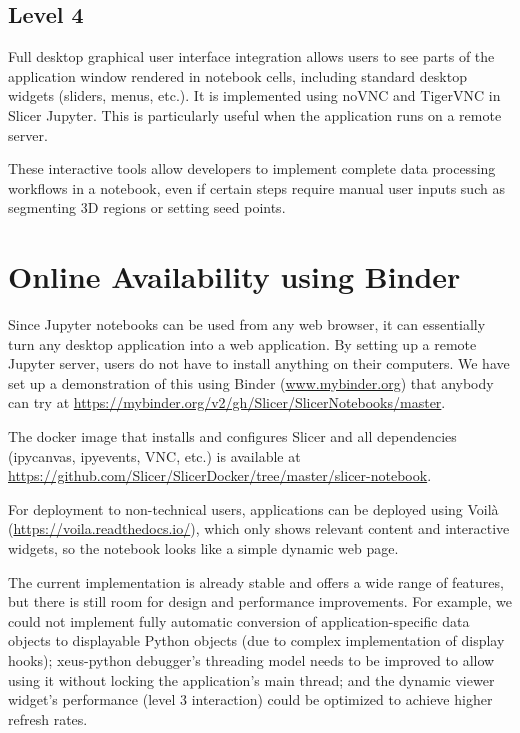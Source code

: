 \documentclass{IEEEcsmag}
\begin{document}
\subsection{Level 4}

Full desktop graphical user interface integration allows users to see parts of the application window rendered in notebook cells, including standard desktop widgets (sliders, menus, etc.). It is implemented using noVNC and TigerVNC in Slicer Jupyter. This is particularly useful when the application runs on a remote server.

These interactive tools allow developers to implement complete data processing workflows in a notebook, even if certain steps require manual user inputs such as segmenting 3D regions or setting seed points.


\section{Online Availability using Binder}

Since Jupyter notebooks can be used from any web browser, it can essentially turn any desktop application into a web application. By setting up a remote Jupyter server, users do not have to install anything on their computers. We have set up a demonstration of this using Binder \cite{binder2} (\url{www.mybinder.org}) that anybody can try at \url{https://mybinder.org/v2/gh/Slicer/SlicerNotebooks/master}.

The docker image that installs and configures Slicer and all dependencies (ipycanvas, ipyevents, VNC, etc.) is available at \url{https://github.com/Slicer/SlicerDocker/tree/master/slicer-notebook}.

For deployment to non-technical users, applications can be deployed using Voilà (\url{https://voila.readthedocs.io/}), which only shows relevant content and interactive widgets, so the notebook looks like a simple dynamic web page.

The current implementation is already stable and offers a wide range of features, but there is still room for design and performance improvements. For example, we could not implement fully automatic conversion of application-specific data objects to displayable Python objects (due to complex implementation of display hooks); xeus-python debugger’s threading model needs to be improved to allow using it without locking the application’s main thread; and the dynamic viewer widget’s performance (level 3 interaction) could be optimized to achieve higher refresh rates.
\end{document}
